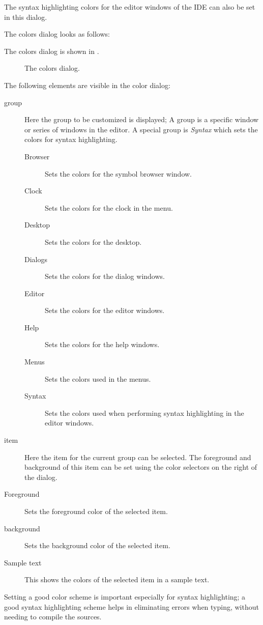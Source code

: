The syntax highlighting colors for the editor windows of the IDE can also 
be set in this dialog.
\begin{htmlonly}
The colors dialog looks as follows:
\end{htmlonly}
\begin{latexonly}
The colors dialog is shown in .
\begin{figure}[ht]
\begin{center}
\caption{The colors dialog.}\label{fig:ocolors}
\ifpdf
{}
\else
{}
\fi
\end{center}
\end{figure}
\end{latexonly}
The following elements are visible in the color dialog:
\begin{description}
\item[group]
Here the group to be customized is displayed; A group is a specific window
or series of windows in the editor. A special group is {\em Syntax} which
sets the colors for syntax highlighting.
\begin{description}
\item[Browser] Sets the colors for the symbol browser window.
\item[Clock] Sets the colors for the clock in the menu.
\item[Desktop] Sets the colors for the desktop.
\item[Dialogs] Sets the colors for the dialog windows.
\item[Editor] Sets the colors for the editor windows.
\item[Help] Sets the colors for the help windows.
\item[Menus] Sets the colors used in the menus.
\item[Syntax] Sets the colors used when performing syntax highlighting in the
editor windows.
\end{description}
\item[item]
Here the item for the current group can be selected. The foreground and
background of this item can be set using the color selectors on the right of
the dialog.
\item[Foreground]
Sets the foreground color of the selected item. 
\item[background]
Sets the background color of the selected item.
\item[Sample text]
This shows the colors of the selected item in a sample text.
\end{description}
Setting a good color scheme is important especially for syntax highlighting;
a good syntax highlighting scheme helps in eliminating errors when typing,
without needing to compile the sources. 

